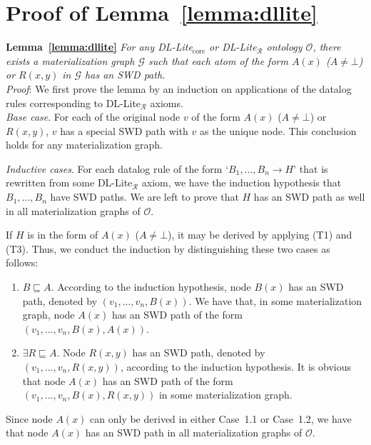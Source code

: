 \section{Proof of Lemma~\ref{lemma:dllite}}

\textbf{Lemma~\ref{lemma:dllite}}
\emph{For any DL-Lite$_{\text{core}}$ or DL-Lite$_\mathcal{R}$ ontology $\mathcal{O}$, there exists a materialization graph $\mathcal{G}$ such that
each atom of the form $A(x)$ ($A\neq\bot$) or $R(x,y)$ in $\mathcal{G}$ has an SWD path.}\\

\noindent\emph{Proof}: We first prove the lemma by an induction on applications of
the datalog rules corresponding to DL-Lite$_\mathcal{R}$ axioms.\\

\emph{Base case}. For each of the original node $v$ of the form $A(x)$ ($A\neq\bot$) or $R(x,y)$,
$v$ has a special SWD path with $v$ as the unique node. This conclusion holds
for any materialization graph.

\emph{Inductive cases}. For each datalog rule of the form `$B_1,...,B_n\rightarrow H$'
that is rewritten from some DL-Lite$_\mathcal{R}$ axiom, we have the induction hypothesis
that $B_1,...,B_n$ have SWD paths.
We are left to prove that $H$ has an SWD path as well
in all materialization graphs of $\mathcal{O}$.

If $H$ is in the form of $A(x)$ ($A\neq\bot$), it may be derived by
applying (T1) and (T3). Thus, we conduct the induction by
distinguishing these two cases as follows:

\begin{enumerate}[leftmargin=12ex,label=Case~1.\arabic*]
\item $B\sqsubseteq A$. According to the induction hypothesis,
node $B(x)$ has an SWD path, denoted by $(v_1,...,v_n,B(x))$.
We have that, in some materialization graph, node $A(x)$
has an SWD path of the form $(v_1,...,v_n,B(x),A(x))$.

\item $\exists R\sqsubseteq A$. Node $R(x,y)$ has an SWD path,
denoted by $(v_1,...,v_n,R(x,y))$,
according to the induction hypothesis.
It is obvious that node $A(x)$
has an SWD path of the form $(v_1,...,v_n,B(x),R(x,y))$
in some materialization graph.
\end{enumerate}

Since node $A(x)$ can only be derived in either Case~1.1
or Case~1.2, we have that
node $A(x)$ has an SWD path in all materialization graphs of $\mathcal{O}$.

